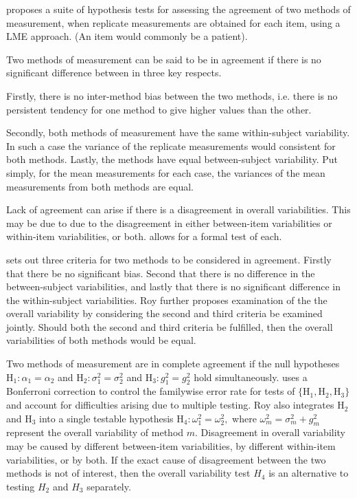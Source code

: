 \documentclass[12pt, a4paper]{article}
\theoremstyle{plain}
\theoremstyle{definition}
\theoremstyle{remark}
\begin{document}
\citet{ARoy2009} proposes a suite of hypothesis tests for assessing the agreement of two methods of measurement, when replicate measurements are obtained for each item, using a LME approach. (An item would commonly be a patient).  
	
	Two methods of measurement can be said to be in agreement if there is no significant difference between in three key respects. 
	
	Firstly, there is no inter-method bias between the two methods, i.e. there is no persistent tendency for one method to give higher values than the other.
	
	Secondly, both methods of measurement have the same  within-subject variability. In such a case the variance of the replicate measurements would consistent for both methods.
	Lastly, the methods have equal between-subject variability.  Put simply, for the mean measurements for each case, the variances of the mean measurements from both methods are equal.

	Lack of agreement can arise if there is a disagreement in overall variabilities. This may be due to due to the disagreement in either between-item
	variabilities or within-item variabilities, or both. \citet{ARoy2009} allows for a formal test of each.

	\citet{ARoy2009} sets out three criteria for two methods to be considered in agreement. Firstly that there be no significant bias. Second that there is no difference in the between-subject variabilities, and lastly that there is no significant difference in the within-subject variabilities. Roy further proposes examination of the the overall variability by considering the second and third criteria be examined jointly. Should both the second and third criteria be fulfilled, then the overall variabilities of both methods would be equal.
	
		Two methods of measurement are in complete agreement if the null hypotheses $\mathrm{H}_1\colon \alpha_1 = \alpha_2$ and $\mathrm{H}_2\colon \sigma^2_1 = \sigma^2_2 $ and $\mathrm{H}_3\colon g^2_1= g^2_2$ hold simultaneously. \citet{ARoy2009} uses a Bonferroni correction to control the familywise error rate for tests of $\{\mathrm{H}_1, \mathrm{H}_2, \mathrm{H}_3\}$ and account for difficulties arising due to multiple testing. Roy also integrates $\mathrm{H}_2$ and $\mathrm{H}_3$ into a single testable hypothesis $\mathrm{H}_4\colon \omega^2_1=\omega^2_2,$ where $\omega^2_m = \sigma^2_m + g^2_m$ represent the overall variability of method $m.$  Disagreement in overall variability may be caused by different between-item variabilities, by different within-item variabilities, or by both.  If the exact cause of disagreement between the two methods is not of interest, then the overall variability test $H_4$ is an alternative to testing $H_2$ and $H_3$ separately.
		
\end{document}
